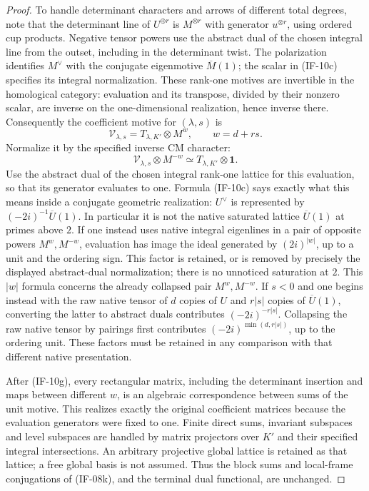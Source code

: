 \begin{proof}
To handle determinant characters and arrows of different total
degrees, note that the determinant line of $U^{\oplus r}$ is
$M^{\otimes r}$ with generator $u^{\otimes r}$, using ordered cup
products. Negative tensor powers use the abstract dual of the chosen integral
line from the outset, including in the determinant twist. The polarization
identifies $M^\vee$ with the conjugate eigenmotive $\overline M(1)$;
the scalar in (IF-10c) specifies its integral normalization. These
rank-one motives are invertible in the homological category: evaluation
and its transpose, divided by their nonzero scalar, are inverse on the
one-dimensional realization, hence inverse there. Consequently the
coefficient motive for $(\lambda,s)$ is
\[
 \mathcal V_{\lambda,s}=T_{\lambda,K'}\otimes M^w,
 \qquad w=d+rs.
\]
Normalize it by the specified inverse CM character:
\[
 \mathcal V_{\lambda,s}\otimes M^{-w}
       \simeq T_{\lambda,K'}\otimes\mathbf1.       \tag{IF-10g}
\]
Use the abstract dual of the chosen integral rank-one lattice for this
evaluation, so that its generator evaluates to one. Formula (IF-10c)
says exactly what this means inside a conjugate geometric realization:
$U^\vee$ is represented by
$(-2i)^{-1}\overline U(1)$. In particular it is not the native
saturated lattice $\overline U(1)$ at primes above $2$. If one instead
uses native integral eigenlines in a pair of opposite powers
$M^w,M^{-w}$, evaluation has image the ideal generated by
$(2i)^{|w|}$, up to a unit and the ordering sign. This factor is retained,
or is removed by precisely the displayed abstract-dual normalization;
there is no unnoticed saturation at $2$. This $|w|$ formula concerns
the already collapsed pair $M^w,M^{-w}$. If $s<0$ and one begins
instead with the raw native tensor of $d$ copies of $U$ and
$r|s|$ copies of $\overline U(1)$, converting the latter to abstract
duals contributes $(-2i)^{-r|s|}$. Collapsing the raw native tensor by
pairings first contributes $(-2i)^{\min(d,r|s|)}$, up to the ordering
unit. These factors must be retained in any comparison with that
different native presentation.

After (IF-10g), every rectangular matrix, including the determinant
insertion and maps between different $w$, is an algebraic correspondence
between sums of the unit motive. This realizes exactly the original
coefficient matrices because the evaluation generators were fixed to
one. Finite direct sums, invariant subspaces and level subspaces are
handled by matrix projectors over $K'$ and their specified integral
intersections. An arbitrary projective global lattice is retained as
that lattice; a free global basis is not assumed. Thus the block sums
and local-frame conjugations of (IF-08k), and the terminal dual
functional, are unchanged.


\end{proof}
